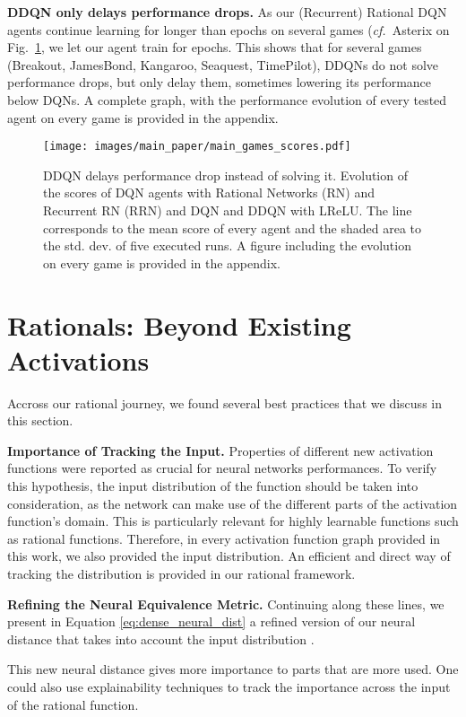 \documentclass{article}
\newcommand{\cf}{\emph{cf.}~}
\begin{document}
\textbf{DDQN only delays performance drops.}
As our (Recurrent) Rational DQN agents continue learning for longer than  epochs on several games (\cf Asterix on Fig.~\ref{fig:Agents_sample_final}, we let our agent train for  epochs. This shows that for several games (Breakout, JamesBond, Kangaroo, Seaquest, TimePilot), DDQNs do not solve performance drops, but only delay them, sometimes lowering its performance below DQNs.
A complete graph, with the performance evolution of every tested agent on every game is provided in the appendix.

\begin{figure}[t]
\centering
\texttt{[image: images/main\_paper/main\_games\_scores.pdf]} \caption{DDQN delays performance drop instead of solving it. Evolution of the scores of DQN agents with Rational Networks (RN) and Recurrent RN (RRN) and DQN and DDQN with LReLU. The line corresponds to the mean score of every agent and the shaded area to the std. dev. of five executed runs. A figure including the evolution on every game is provided in the appendix.}
\label{fig:Agents_sample_final}
\end{figure}


\section{Rationals: Beyond Existing Activations}
Accross our rational journey, we found several best practices that we discuss in this section.

\textbf{Importance of Tracking the Input.}
Properties of different new activation functions \cite{georgescu2020non, Misra20} were reported as crucial for neural networks performances. To verify this hypothesis, the input distribution of the function should be taken into consideration, as the network can make use of the different parts of the activation function's domain. This is particularly relevant for highly learnable functions such as rational functions. Therefore, in every activation function graph provided in this work, we also provided the input distribution. An efficient and direct way of tracking the distribution is provided in our rational framework. 

\textbf{Refining the Neural Equivalence Metric.}
Continuing along these lines, we present in Equation \ref{eq:dense_neural_dist} a refined version of our neural distance that takes into account the input distribution .

This new neural distance gives more importance to parts that are more used. One could also use explainability techniques \cite{Haofan2019Score, shao2021aaai} to track the importance across the input of the rational function.
\end{document}
